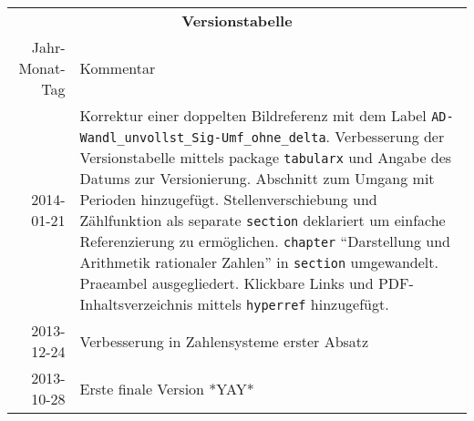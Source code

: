 \begin{table}[htp]
\centering
\begin{tabularx}{\columnwidth}{rp{}}
\multicolumn{2}{c}{\textbf{Versionstabelle}} \\
Jahr-Monat-Tag & Kommentar \\ \hline
2014-01-21 & Korrektur einer doppelten Bildreferenz mit dem Label \texttt{AD-Wandl\_unvollst\_Sig-Umf\_ohne\_delta}.  
Verbesserung der Versionstabelle mittels package \texttt{tabularx} und Angabe des Datums zur Versionierung. 
Abschnitt zum Umgang mit Perioden hinzugefügt. 
Stellenverschiebung und Zählfunktion als separate \texttt{section} deklariert um einfache Referenzierung zu ermöglichen.
\texttt{chapter} "`Darstellung und Arithmetik rationaler Zahlen"' in \texttt{section} umgewandelt. 
Praeambel ausgegliedert.
Klickbare Links und PDF-Inhaltsverzeichnis mittels \texttt{hyperref} hinzugefügt.
\\
2013-12-24 & Verbesserung in Zahlensysteme erster Absatz \\
2013-10-28 & Erste finale Version *YAY* \\
\end{tabularx}
\end{table}